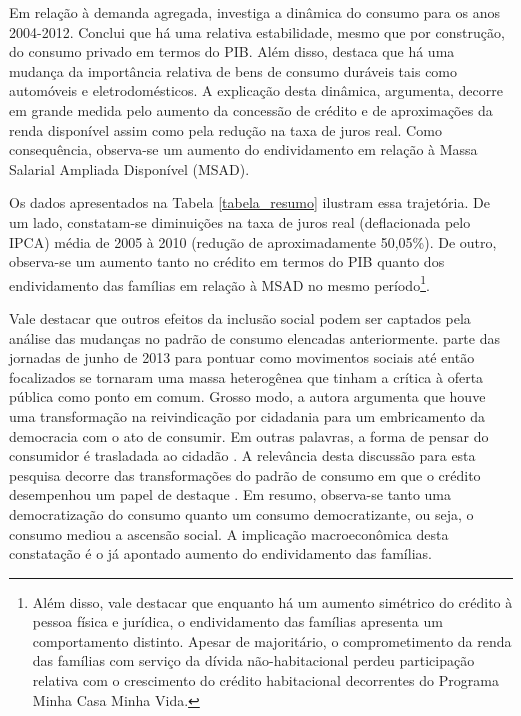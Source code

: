 Em relação à demanda agregada, \textcite{dos_santos_notas_2013} investiga a dinâmica do consumo para os anos 2004-2012. Conclui que há uma relativa estabilidade, mesmo que por construção, do consumo privado em termos do PIB. Além disso, destaca que há uma mudança da importância relativa de bens de consumo duráveis tais como automóveis e eletrodomésticos. A explicação desta dinâmica, argumenta, decorre em grande medida pelo aumento da concessão de crédito e de aproximações da renda disponível assim como pela redução na taxa de juros real. Como consequência, observa-se um aumento do endividamento em relação à Massa Salarial Ampliada Disponível (MSAD).

Os dados apresentados na Tabela \ref{tabela_resumo} ilustram essa trajetória. De um lado, constatam-se diminuições na taxa de juros real (deflacionada pelo IPCA) média de 2005 à 2010 (redução de aproximadamente 50,05\%). De outro, observa-se um aumento tanto no crédito em termos do PIB quanto dos endividamento das famílias em relação à MSAD no mesmo período\footnote{Além disso, vale destacar que enquanto há um aumento simétrico do crédito à pessoa física e jurídica, o endividamento das famílias apresenta um comportamento distinto. Apesar de majoritário, o comprometimento da renda das famílias com serviço da dívida não-habitacional perdeu participação relativa com o crescimento do crédito habitacional decorrentes do Programa Minha Casa Minha Vida. }. 

Vale destacar que outros efeitos da inclusão social podem ser captados pela análise das mudanças no padrão de consumo elencadas anteriormente. \textcite{fontenelle_alcances_2016} parte das jornadas de junho de 2013 para pontuar como movimentos sociais até então focalizados se tornaram uma massa heterogênea que tinham a crítica à oferta pública como ponto em comum. Grosso modo, a autora argumenta que houve uma transformação na reivindicação por cidadania para um embricamento da democracia com o ato de consumir. Em outras palavras, a forma de pensar do consumidor é trasladada ao cidadão \cite{streeck_citizens_2012}. 
A relevância desta discussão para esta pesquisa decorre das transformações do padrão de consumo em que o crédito desempenhou um papel de destaque \cite{schettini_novas_2011}. Em resumo, observa-se tanto uma democratização do consumo quanto um consumo democratizante, ou seja, o consumo mediou a ascensão social. A implicação macroeconômica desta constatação é o já apontado aumento do endividamento das famílias. 



